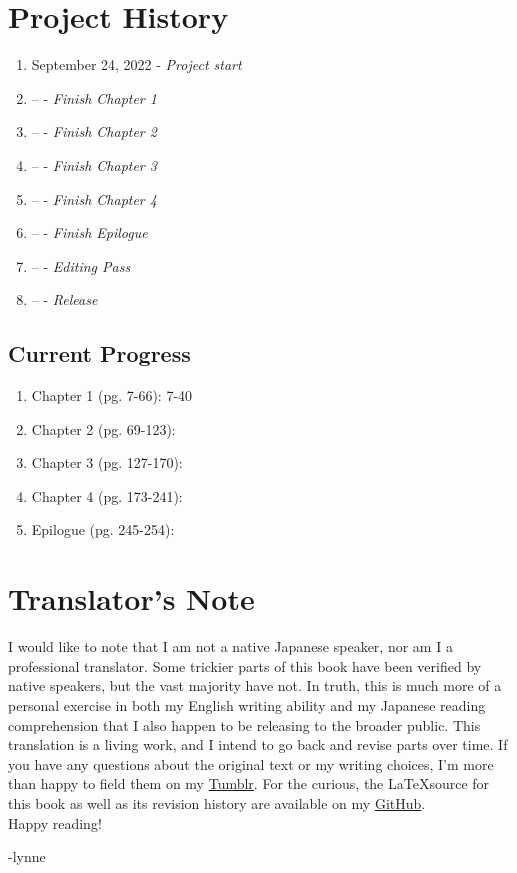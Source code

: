 \section*{Project History}
\begin{enumerate}
	\item September 24, 2022 - \emph{Project start}
	\item -- - \emph{Finish Chapter 1}
	\item -- - \emph{Finish Chapter 2}
	\item -- - \emph{Finish Chapter 3}
	\item -- - \emph{Finish Chapter 4}
	\item -- - \emph{Finish Epilogue}
	\item -- - \emph{Editing Pass}
	\item -- - \emph{Release}
\end{enumerate}
\subsection*{Current Progress}
\begin{enumerate}
	\item Chapter 1 (pg. 7-66): 7-40
	\item Chapter 2 (pg. 69-123):
	\item Chapter 3 (pg. 127-170):
	\item Chapter 4 (pg. 173-241):
	\item Epilogue (pg. 245-254):
\end{enumerate}

\section*{Translator's Note}
I would like to note that I am not a native Japanese speaker, nor am I a professional translator. Some trickier parts of this book have been verified by native speakers, but the vast majority have not. In truth, this is much more of a personal exercise in both my English writing ability and my Japanese reading comprehension that I also happen to be releasing to the broader public. This translation is a living work, and I intend to go back and revise parts over time. If you have any questions about the original text or my writing choices, I'm more than happy to field them on my \href{https://plvpwaa.tumblr.com}{Tumblr}. For the curious, the \LaTeX \space source for this book as well as its revision history are available on my \href{https://github.com/Spirati/translation-octopath}{GitHub}. 
\\

Happy reading!

-lynne